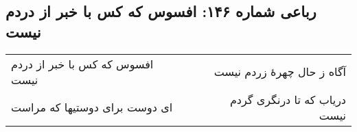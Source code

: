 \begin{center}
\section*{رباعی شماره ۱۴۶: افسوس که کس با خبر از دردم نیست}
\label{sec:sh146}
\begin{longtable}{l p{0.5cm} r}
افسوس که کس با خبر از دردم نیست
&&
آگاه ز حال چهرهٔ زردم نیست
\\
ای دوست برای دوستیها که مراست
&&
دریاب که تا درنگری گردم نیست
\\
\end{longtable}
\end{center}
